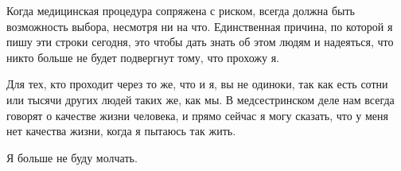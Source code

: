 Когда медицинская процедура сопряжена с риском, всегда должна быть возможность
выбора, несмотря ни на что. Единственная причина, по которой я пишу эти строки
сегодня, это чтобы дать знать об этом людям и надеяться, что никто больше не
будет подвергнут тому, что прохожу я.

Для тех, кто проходит через то же, что и я, вы не одиноки, так как есть сотни
или тысячи других людей таких же, как мы. В медсестринском деле нам всегда
говорят о качестве жизни человека, и прямо сейчас я могу сказать, что у меня нет
качества жизни, когда я пытаюсь так жить.

Я больше не буду молчать.
